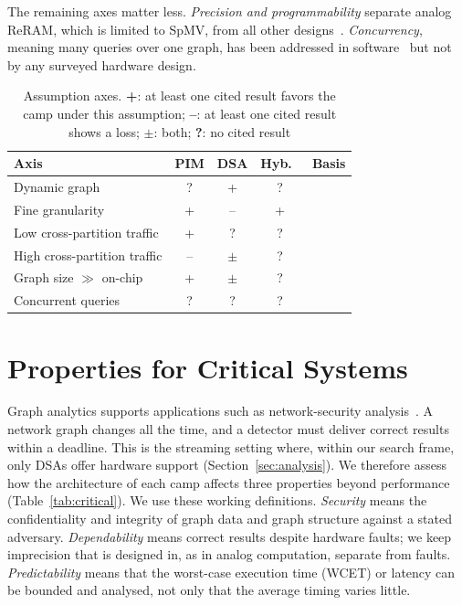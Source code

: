 \documentclass[journal,onecolumn]{IEEEtran}
\begin{document}
The remaining axes matter less. \emph{Precision and programmability} separate analog ReRAM, which is limited to SpMV, from all other designs~\cite{song2018graphr}. \emph{Concurrency}, meaning many queries over one graph, has been addressed in software~\cite{yin2023glign} but not by any surveyed hardware design.

\begin{table}[t]
\caption{Assumption axes. \textbf{+}: at least one cited result favors the camp under this assumption; \textbf{--}: at least one cited result shows a loss; $\pm$: both; \textbf{?}: no cited result}
\label{tab:axes}
\centering\footnotesize
\begin{tabularx}{\columnwidth}{@{}L{4.2cm}cccY@{}}
\toprule
Axis & PIM & DSA & Hyb.\ & Basis \\
\midrule
Dynamic graph & ? & + & ? & \cite{kim2020dynamic,rahman2021jetstream,gao2023mega,asquini2025tc} \\
Fine granularity & + & -- & + & \cite{shin2025piccolo,shin2025fala,yenimol2026cograf} \\
Low cross-partition traffic & + & ? & ? & \cite{gomezluna2022prim,cai2024pimpam} \\
High cross-partition traffic & -- & $\pm$ & ? & \cite{gomezluna2022prim,barkhordar2025alphapim,zhuo2019graphq,dadu2021polygraph,orenesvera2023dalorex} \\
Graph size $\gg$ on-chip & + & $\pm$ & ? & \cite{ahn2015tesseract,lee2022graphwave,chen2022regraph} \\
Concurrent queries & ? & ? & ? & \cite{yin2023glign} \\
\bottomrule
\end{tabularx}
\end{table}

\section{Properties for Critical Systems}\label{sec:critical}
Graph analytics supports applications such as network-security analysis~\cite{asquini2025tc}. A network graph changes all the time, and a detector must deliver correct results within a deadline. This is the streaming setting where, within our search frame, only DSAs offer hardware support (Section~\ref{sec:analysis}). We therefore assess how the architecture of each camp affects three properties beyond performance (Table~\ref{tab:critical}). We use these working definitions. \emph{Security} means the confidentiality and integrity of graph data and graph structure against a stated adversary. \emph{Dependability} means correct results despite hardware faults; we keep imprecision that is designed in, as in analog computation, separate from faults. \emph{Predictability} means that the worst-case execution time (WCET) or latency can be bounded and analysed, not only that the average timing varies little.
\end{document}
